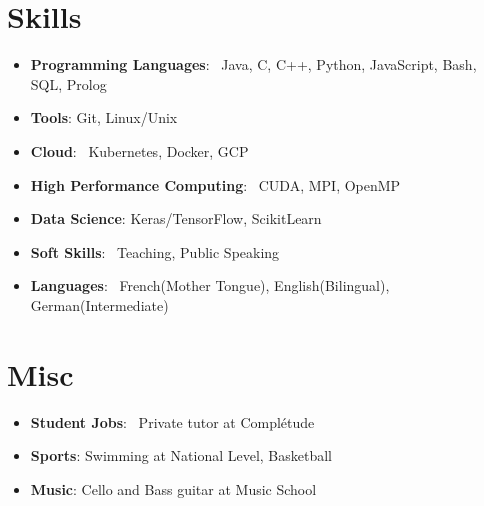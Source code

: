\documentclass[a4paper,20pt]{article}
\newcommand{\resumeItem}[2]{
  \item\small{
    \textbf{#1}{: #2 \vspace{-2pt}}
  }
}
\newcommand{\resumeSubItem}[2]{\resumeItem{#1}{#2}\vspace{-3pt}}
\newcommand{\resumeSubHeadingListStart}{\begin{itemize}[leftmargin=*]}
\newcommand{\resumeSubHeadingListEnd}{\end{itemize}}
\begin{document}
\vspace{5pt}

\section{Skills}
 \resumeSubHeadingListStart
  \resumeSubItem{Programming Languages}{~Java, C, C++, Python, JavaScript, Bash, SQL, Prolog}
  \resumeSubItem{Tools}{Git, Linux/Unix}
  \resumeSubItem{Cloud}{~Kubernetes, Docker, GCP}
  \resumeSubItem{High Performance Computing}{~CUDA, MPI, OpenMP}
  \resumeSubItem{Data Science}{Keras/TensorFlow, ScikitLearn}

  \resumeSubItem{Soft Skills}{~Teaching, Public Speaking }
  \resumeSubItem{Languages}{~French(Mother Tongue), English(Bilingual), German(Intermediate)}
 \resumeSubHeadingListEnd

\vspace{5pt}

\section{Misc}
 \resumeSubHeadingListStart
  \resumeSubItem{Student Jobs}{~Private tutor at Complétude}
  \resumeSubItem{Sports}{Swimming at National Level, Basketball}
  \resumeSubItem{Music}{Cello and Bass guitar at Music School}
 \resumeSubHeadingListEnd
\end{document}
